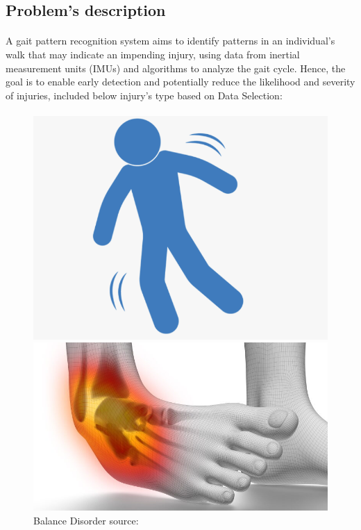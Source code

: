 \subsection{Problem's description}
\STANDARD{\insertsection}
{
\framesubtitle{\insertsubsection}

A gait pattern recognition system aims to identify patterns in an individual's walk that may indicate an impending injury, using data from inertial measurement units (IMUs) and algorithms to analyze the gait cycle. Hence, the goal is to enable early detection and potentially reduce the likelihood and severity of injuries, included below injury's type based on Data Selection:

\bigskip

\framesubtitle{\insertsubsection}
 \begin{figure}[ht]
        \begin{minipage}[b]{0.22\linewidth}
            \centering
            \includegraphics[width=\textwidth]{img/Balance Disorder.png}
            \caption{Balance Disorder source:\cite{BalanceDisorder2023}}
            \label{fig:a}
        \end{minipage}
        \hspace{0.5cm}
        \begin{minipage}[b]{0.20\linewidth}
            \centering
            \includegraphics[width=\textwidth]{img/Ankle Sprain.jpeg}

\end{minipage}
\end{figure}}
